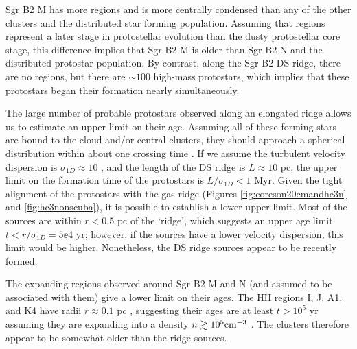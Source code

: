 \documentclass[twocolumn]{aastex61}
\begin{document}
Sgr B2 M has more \hii regions and is more centrally condensed than any of the
other clusters and the distributed star forming population.  Assuming that \hii
regions represent a later stage in protostellar evolution than the dusty
protostellar core stage, this difference implies that Sgr B2 M is older than
Sgr B2 N and the distributed protostar population.  By contrast, along the Sgr
B2 DS ridge, there are no \hii regions, but there are $\sim100$ high-mass
protostars, which implies that these protostars began their formation nearly
simultaneously.

The large number of probable protostars observed along an elongated ridge
allows us to estimate an upper limit on their age.  Assuming all of these
forming stars are bound to the cloud and/or central clusters, they should
approach a spherical distribution within about one crossing time
\citep{Efremov1998a}.  If we assume the turbulent velocity dispersion is
$\sigma_{1D}\approx10$ \kms \citep[e.g.][]{Henshaw2016a}, and the length of the
DS ridge is $L\approx10$ pc, the upper limit on the formation time of the
protostars is $L/\sigma_{1D}<1$ Myr.  Given the tight alignment of the
protostars with the gas ridge (Figures \ref{fig:coreson20cmandhc3n} and
\ref{fig:hc3nonscuba}), it is  possible to establish a lower upper
limit.  Most of the sources are within $r<0.5$ pc of the `ridge', which
suggests an upper age limit $t<r/\sigma_{1D}=5\ee{4}$ yr; however, if
the sources have a lower velocity dispersion, this limit would be higher.
Nonetheless, the DS ridge sources appear to be recently formed.

The expanding \hii regions observed around Sgr B2 M and N (and assumed to be
associated with them) give a lower limit on their ages.  The HII regions I, J,
A1, and K4 have radii $r\approx0.1$ pc \citep{Gaume1995a}, suggesting their
ages are at least $t>10^5$ yr assuming they are expanding into 
a density $n\gtrsim10^5 \textrm{cm}^{-3}$ \citep{de-Pree1995a,Schmiedeke2016a}.
The clusters therefore appear to be somewhat older than the ridge sources.

\end{document}
